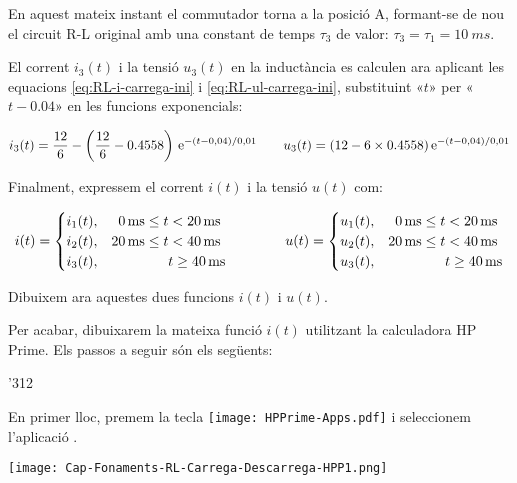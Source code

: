 \begin{exemple}
    En aquest mateix instant  el commutador torna a la posició A, formant-se de nou el circuit R-L original amb una constant de temps $\tau_3$ de valor: $\tau_3 = \tau_1 = \qty{10}{ms}$.

    El corrent $i_3(t)$ i la tensió $u_3(t)$ en la inductància es calculen ara aplicant les equacions \eqref{eq:RL-i-carrega-ini} i \eqref{eq:RL-ul-carrega-ini}, substituint «$t$» per «$t-\num{0,04}$» en les funcions exponencials:

    \[
        i_3(t) = \frac{12}{6} - \left(\frac{12}{6}-\num{0,4558}\right) \,\mathrm{e}^{-(t-0,04)/0,01} \qquad
        u_3(t) = (12-6\times\num{0,4558}) \,\mathrm{e}^{-(t-0,04)/0,01}
    \]

    Finalment,  expressem el corrent $i(t)$  i la tensió $u(t)$ com:

    \[
        i(t) =
        \begin{cases}
            i_1(t), &  \phantom{0}\qty{0}{ms} \leq t < \qty{20}{ms} \\
            i_2(t), &  \qty{20}{ms} \leq t < \qty{40}{ms} \\
            i_3(t), &  \hspace{1.43cm}t \geq \qty{40}{ms}
        \end{cases}
        \qquad\qquad
        u(t) =
        \begin{cases}
            u_1(t), &  \phantom{0}\qty{0}{ms} \leq t < \qty{20}{ms} \\
            u_2(t), &  \qty{20}{ms} \leq t < \qty{40}{ms} \\
            u_3(t), &  \hspace{1.43cm}t \geq \qty{40}{ms}
        \end{cases}
    \]

    Dibuixem ara aquestes dues funcions  $i(t)$ i $u(t)$.

    \begin{center}
      
    \end{center}

    Per acabar, dibuixarem la mateixa funció $i(t)$ utilitzant la calculadora \textsf{HP Prime}.
     Els passos a seguir són els següents:
    \begin{dingautolist}{'312}
        \item En primer lloc, premem la tecla \texttt{[image: HPPrime-Apps.pdf]} i seleccionem l'aplicació .

             \texttt{[image: Cap-Fonaments-RL-Carrega-Descarrega-HPP1.png]}


\end{dingautolist}
\end{exemple}

